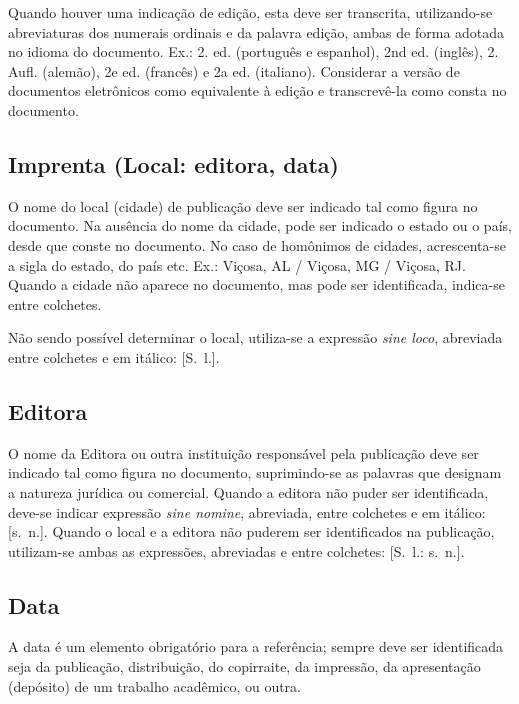Quando houver uma indicação de edição, esta deve ser transcrita, utilizando-se abreviaturas dos numerais ordinais e da palavra edição, ambas de forma adotada no idioma do documento. Ex.: 2. ed. (português e espanhol), 2nd ed. (inglês), 2. Aufl. (alemão), 2e ed. (francês) e 2a ed. (italiano). Considerar a versão de documentos eletrônicos como equivalente à edição e transcrevê-la como consta no documento.


\subsection{Imprenta (Local: editora, data)}

O nome do local (cidade) de publicação deve ser indicado tal como figura no documento. Na ausência do nome da cidade, pode ser indicado o estado ou o país, desde que conste no documento. No caso de homônimos de cidades, acrescenta-se a sigla do estado, do país etc. Ex.: Viçosa, AL / Viçosa, MG / Viçosa, RJ. Quando a cidade não aparece no documento, mas pode ser identificada, indica-se entre colchetes.



Não sendo possível determinar o local, utiliza-se a expressão \textit{sine loco}, abreviada entre colchetes e em itálico: [S.\ l.].

\subsection{Editora}

O nome da Editora ou outra instituição responsável pela publicação deve ser indicado tal como figura no documento, suprimindo-se as palavras que designam a natureza jurídica ou comercial. Quando a editora não puder ser identificada, deve-se indicar expressão \textit{sine nomine}, abreviada, entre colchetes e em itálico: [s.\ n.]. Quando o local e a editora não puderem ser identificados na publicação, utilizam-se ambas as expressões, abreviadas e entre colchetes: [S.\ l.: s.\ n.].

\subsection{Data}

A data é um elemento obrigatório para a referência; sempre deve ser identificada seja da publicação, distribuição, do copirraite, da impressão, da apresentação (depósito) de um trabalho acadêmico, ou outra.

